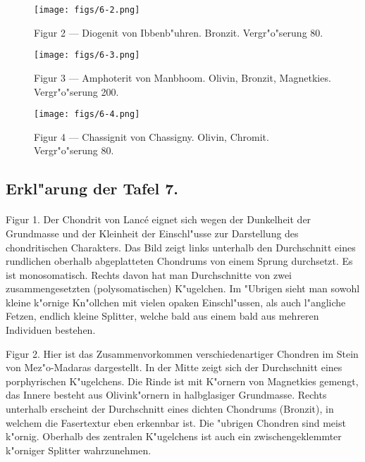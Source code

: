 \documentclass[a4paper, 11pt, oneside, polutonikogreek, german]{article}
\begin{document}
\vspace*{\fill}
\begin{figure}[H]
\centering
\texttt{[image: figs/6-2.png]}
\caption{\small Figur 2 --- Diogenit von Ibbenb"uhren. Bronzit. Vergr"o"serung 80.}
\end{figure}
\vspace*{\fill}
\clearpage

\vspace*{\fill}
\begin{figure}[H]
\centering
\texttt{[image: figs/6-3.png]}
\caption{\small Figur 3 --- Amphoterit von Manbhoom. Olivin, Bronzit, Magnetkies. Vergr"o"serung 200.}
\end{figure}
\vspace*{\fill}
\clearpage

\vspace*{\fill}
\begin{figure}[H]
\centering
\texttt{[image: figs/6-4.png]}
\caption{\small Figur 4 --- Chassignit von Chassigny. Olivin, Chromit. Vergr"o"serung 80.}
\end{figure}
\vspace*{\fill}
\clearpage

\subsection{Erkl"arung der Tafel 7.}
\paragraph{}
Figur 1. Der Chondrit von Lancé eignet sich wegen der Dunkelheit der Grundmasse und der Kleinheit der Einschl"usse zur Darstellung des chondritischen Charakters. Das Bild zeigt links unterhalb den Durchschnitt eines rundlichen oberhalb abgeplatteten Chondrums von einem Sprung durchsetzt. Es ist monosomatisch. Rechts davon hat man Durchschnitte von zwei zusammengesetzten (polysomatischen) K"ugelchen. Im "Ubrigen sieht man sowohl kleine k"ornige Kn"ollchen mit vielen opaken Einschl"ussen, als auch l"angliche Fetzen, endlich kleine Splitter, welche bald aus einem bald aus mehreren Individuen bestehen.

Figur 2. Hier ist das Zusammenvorkommen verschiedenartiger Chondren im Stein von Mez"o-Madaras dargestellt. In der Mitte zeigt sich der Durchschnitt eines porphyrischen K"ugelchens. Die Rinde ist mit K"ornern von Magnetkies gemengt, das Innere besteht aus Olivink"ornern in halbglasiger Grundmasse. Rechts unterhalb erscheint der Durchschnitt eines dichten Chondrums (Bronzit), in welchem die Fasertextur eben erkennbar ist. Die "ubrigen Chondren sind meist k"ornig. Oberhalb des zentralen K"ugelchens ist auch ein zwischengeklemmter k"orniger Splitter wahrzunehmen.
\end{document}
